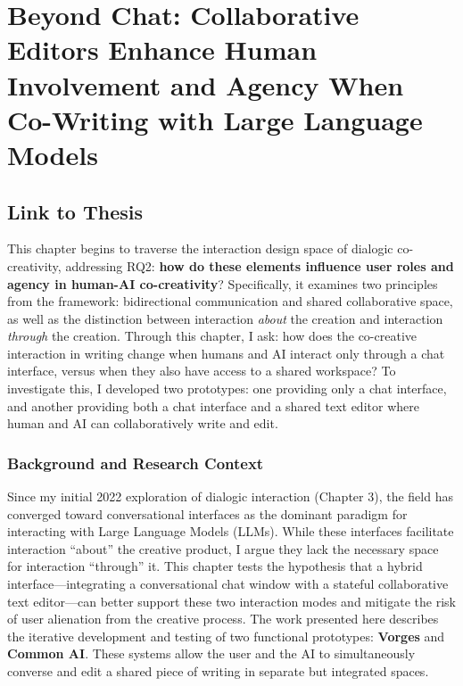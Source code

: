 
\chapter{Beyond Chat: Collaborative Editors Enhance Human Involvement and Agency When Co-Writing with Large Language Models} \label{c:tc5} 


\section{Link to Thesis}
This chapter begins to traverse the interaction design space of dialogic co-creativity, addressing RQ2: \textbf{how do these elements influence user roles and agency in human-AI co-creativity}? Specifically, it examines two principles from the framework: bidirectional communication and shared collaborative space, as well as the distinction between interaction \textit{about} the creation and interaction \textit{through} the creation. Through this chapter, I ask: how does the co-creative interaction in writing change when humans and AI interact only through a chat interface, versus when they also have access to a shared workspace? To investigate this, I developed two prototypes: one providing only a chat interface, and another providing both a chat interface and a shared text editor where human and AI can collaboratively write and edit.
\subsection{Background and Research Context}
Since my initial 2022 exploration of dialogic interaction (Chapter 3), the field has converged toward conversational interfaces as the dominant paradigm for interacting with Large Language Models (LLMs). While these interfaces facilitate interaction ``about'' the creative product, I argue they lack the necessary space for interaction ``through'' it. This chapter tests the hypothesis that a hybrid interface---integrating a conversational chat window with a stateful collaborative text editor---can better support these two interaction modes and mitigate the risk of user alienation from the creative process.
The work presented here describes the iterative development and testing of two functional prototypes: \textbf{Vorges} and \textbf{Common AI}. These systems allow the user and the AI to simultaneously converse and edit a shared piece of writing in separate but integrated spaces.
